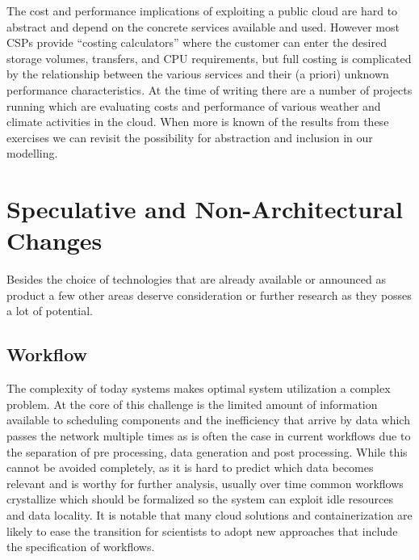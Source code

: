\documentclass{../../template/esiwace-report}
\begin{document}
The cost and performance implications of exploiting a public cloud are hard to abstract and depend on the concrete services available and used. However
most CSPs provide ``costing calculators'' where the customer can enter the desired storage volumes, transfers, and CPU requirements, but full costing
is complicated by the relationship between the various services and their (a priori) unknown performance characteristics. At the time of writing there are a
number of projects running which are evaluating costs and performance of various weather and climate activities in the cloud. When more is known
of the results from these exercises we can revisit the possibility for abstraction and inclusion in our modelling.

\section{Speculative and Non-Architectural Changes}
\label{sec:conclusion}


Besides the choice of technologies that are already available or announced as product a few other areas  deserve consideration or further research as they posses a lot of potential.


\subsection{Workflow}

The complexity of today systems makes optimal system utilization a complex problem.
At the core of this challenge is the limited amount of information available to scheduling components and the inefficiency that arrive by data which passes the network multiple times as is often the case in current workflows due to the separation of pre processing, data generation and post processing.
While this cannot be avoided completely, as it is hard to predict which data becomes relevant and is worthy for further analysis, usually over time common workflows crystallize which should be formalized so the system can exploit idle resources and data locality.
It is notable that many cloud solutions and containerization are likely to ease the transition for scientists to adopt new approaches that include the specification of workflows.
\end{document}
